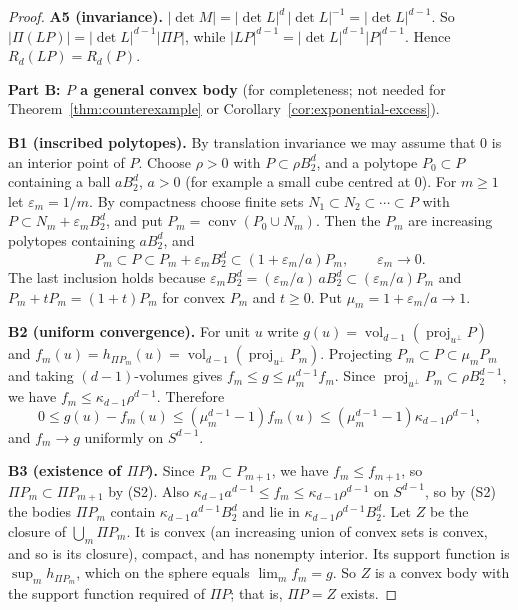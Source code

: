 \documentclass[11pt]{article}
\DeclareMathOperator{\conv}{conv}
\DeclareMathOperator{\vol}{vol}
\DeclareMathOperator{\proj}{proj}
\newcommand{\step}[1]{\smallskip\noindent\textbf{#1}}
\begin{document}
\begin{proof}
\step{A5 (invariance).} \(|\det M|=|\det L|^d\,|\det L|^{-1}
=|\det L|^{d-1}\). So \(|\Pi(LP)|=|\det L|^{d-1}|\Pi P|\), while
\(|LP|^{d-1}=|\det L|^{d-1}|P|^{d-1}\). Hence \(R_d(LP)=R_d(P)\).

\medskip\noindent\textbf{Part B: \(P\) a general convex body}
(for completeness; not needed for Theorem~\ref{thm:counterexample} or
Corollary~\ref{cor:exponential-excess}).

\step{B1 (inscribed polytopes).} By translation invariance we may assume
that \(0\) is an interior point of \(P\). Choose \(\rho>0\) with
\(P\subset\rho B_2^d\), and a polytope \(P_0\subset P\) containing a ball
\(aB_2^d\), \(a>0\) (for example a small cube centred at \(0\)). For
\(m\ge1\) let \(\varepsilon_m=1/m\). By compactness choose finite sets
\(N_1\subset N_2\subset\cdots\subset P\) with
\(P\subset N_m+\varepsilon_mB_2^d\), and put \(P_m=\conv(P_0\cup N_m)\).
Then the \(P_m\) are increasing polytopes containing \(aB_2^d\), and
\[
 P_m\subset P\subset P_m+\varepsilon_mB_2^d
 \subset(1+\varepsilon_m/a)P_m,
 \qquad \varepsilon_m\longrightarrow0.
\]
The last inclusion holds because
\(\varepsilon_mB_2^d=(\varepsilon_m/a)\,aB_2^d\subset(\varepsilon_m/a)P_m\)
and \(P_m+tP_m=(1+t)P_m\) for convex \(P_m\) and \(t\ge0\). Put
\(\mu_m=1+\varepsilon_m/a\to1\).

\step{B2 (uniform convergence).} For unit \(u\) write
\(g(u)=\vol_{d-1}(\proj_{u^\perp}P)\) and \(f_m(u)=h_{\Pi P_m}(u)
=\vol_{d-1}(\proj_{u^\perp}P_m)\). Projecting
\(P_m\subset P\subset\mu_mP_m\) and taking \((d-1)\)-volumes gives
\(f_m\le g\le\mu_m^{d-1}f_m\). Since
\(\proj_{u^\perp}P_m\subset\rho B_2^{d-1}\), we have
\(f_m\le\kappa_{d-1}\rho^{d-1}\). Therefore
\[
 0\le g(u)-f_m(u)
 \le(\mu_m^{d-1}-1)f_m(u)
 \le (\mu_m^{d-1}-1)\kappa_{d-1}\rho^{d-1},
\]
and \(f_m\to g\) uniformly on \(S^{d-1}\).

\step{B3 (existence of \(\Pi P\)).} Since \(P_m\subset P_{m+1}\), we have
\(f_m\le f_{m+1}\), so \(\Pi P_m\subset\Pi P_{m+1}\) by (S2). Also
\(\kappa_{d-1}a^{d-1}\le f_m\le\kappa_{d-1}\rho^{d-1}\) on \(S^{d-1}\), so
by (S2) the bodies \(\Pi P_m\) contain \(\kappa_{d-1}a^{d-1}B_2^d\) and lie
in \(\kappa_{d-1}\rho^{d-1}B_2^d\). Let \(Z\) be the closure of
\(\bigcup_m\Pi P_m\). It is convex (an increasing union of convex sets is
convex, and so is its closure), compact, and has nonempty interior. Its
support function is \(\sup_mh_{\Pi P_m}\), which on the sphere equals
\(\lim_mf_m=g\). So \(Z\) is a convex body with the support function
required of \(\Pi P\); that is, \(\Pi P=Z\) exists.


\end{proof}
\end{document}
